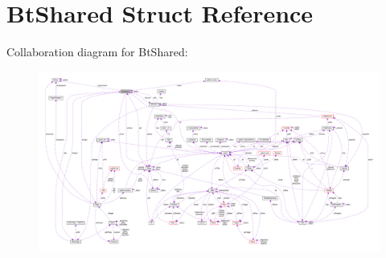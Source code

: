 \hypertarget{struct_bt_shared}{\section{Bt\-Shared Struct Reference}
\label{struct_bt_shared}
}


Collaboration diagram for Bt\-Shared\-:\nopagebreak
\begin{figure}[H]
\begin{center}
\leavevmode
\includegraphics[width=350pt]{struct_bt_shared__coll__graph}
\end{center}
\end{figure}
